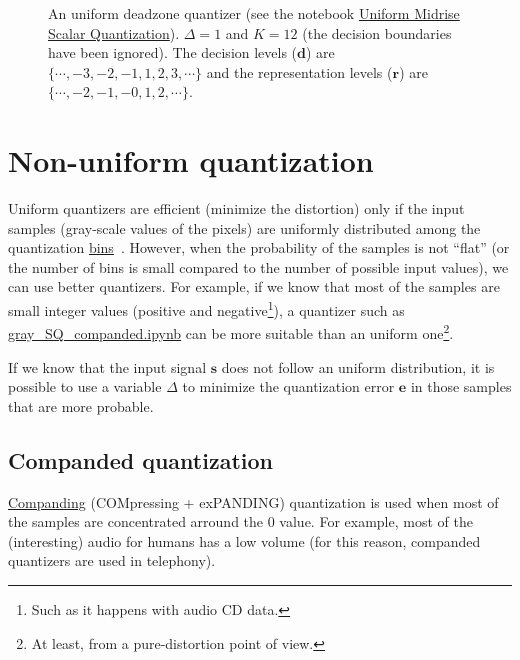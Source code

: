\begin{figure}
  \caption{An uniform deadzone quantizer (see the notebook
    \href{https://github.com/vicente-gonzalez-ruiz/scalar_quantization/blob/master/docs/graphics/deadzone.ipynb}{Uniform
      Midrise Scalar Quantization}). $\Delta=1$ and $K=12$ (the
    decision boundaries have been ignored). The decision levels
    (${\mathbf d}$) are $\{\cdots,-3,-2,-1,1,2,3,\cdots\}$ and the
    representation levels (${\mathbf r}$) are
    $\{\cdots,-2,-1,-0,1,2,\cdots\}$.}
  \label{fig:deadzone}
\end{figure}

\section{Non-uniform quantization}

Uniform quantizers are efficient (minimize the distortion) only if the
input samples (gray-scale values of the pixels) are uniformly
distributed among the quantization
\href{https://en.wikipedia.org/wiki/Data_binning}{bins}~\cite{vruiz__scalar_quantization}. However,
when the probability of the samples is not ``flat'' (or the number of
bins is small compared to the number of possible input values), we can
use better quantizers. For example, if we know that most of the
samples are small integer values (positive and negative\footnote{Such
  as it happens with audio CD data.}), a quantizer such as
\href{https://github.com/vicente-gonzalez-ruiz/scalar_quantization/blob/master/docs/gray_SQ_companded.ipynb}{gray\_SQ\_companded.ipynb}
can be more suitable than an uniform one\footnote{At least, from a
  pure-distortion point of view.}.

If we know that the input signal ${\mathbf s}$ does not follow an
uniform distribution, it is possible to use a variable $\Delta$ to
minimize the quantization error ${\mathbf e}$ in those
samples that are more probable.


\subsection{Companded quantization~\cite{sayood2017introduction}}

\href{https://en.wikipedia.org/wiki/Companding}{Companding}
(COMpressing + exPANDING) quantization is used when most of the
samples are concentrated arround the $0$ value. For example, most of
the (interesting) audio for humans has a low volume (for this reason,
companded quantizers are used in telephony).

